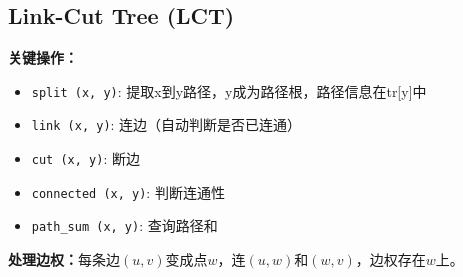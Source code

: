 \documentclass[a4paper, fontset=none]{ctexart}
\begin{document}
\subsection{Link-Cut Tree (LCT)}
\textbf{关键操作：}
\begin{itemize}
\item \texttt{split (x, y)}: 提取x到y路径，y成为路径根，路径信息在tr[y]中
\item \texttt{link (x, y)}: 连边（自动判断是否已连通）
\item \texttt{cut (x, y)}: 断边
\item \texttt{connected (x, y)}: 判断连通性
\item \texttt{path\_sum (x, y)}: 查询路径和
\end{itemize}

\textbf{处理边权：}每条边$(u, v)$变成点$w$，连$(u, w)$和$(w, v)$，边权存在$w$上。
\end{document}
